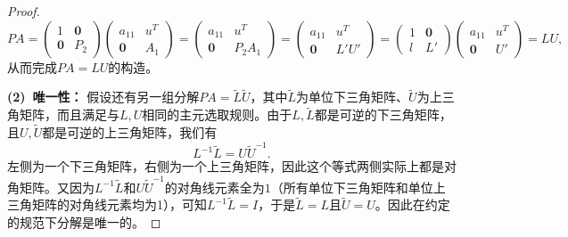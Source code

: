 \begin{proof}
	\[ P A = \begin{pmatrix} 1 & \mathbf{0} \\ \mathbf{0} & P_2 \end{pmatrix}
	\begin{pmatrix} a_{11} & u^T \\ \mathbf{0} & A_1 \end{pmatrix}
	= \begin{pmatrix} a_{11} & u^T \\ \mathbf{0} & P_2 A_1 \end{pmatrix}
	= \begin{pmatrix} a_{11} & u^T \\ \mathbf{0} & L' U' \end{pmatrix}
	= \begin{pmatrix} 1 & \mathbf{0} \\ l & L' \end{pmatrix}
	\begin{pmatrix} a_{11} & u^T \\ \mathbf{0} & U' \end{pmatrix} = L U, \] 
	从而完成$PA=LU$的构造。
	
	\textbf{(2)~唯一性：} 假设还有另一组分解$PA=\tilde{L}\tilde{U}$，其中$\tilde{L}$为单位下三角矩阵、$\tilde{U}$为上三角矩阵，而且满足与$L,U$相同的主元选取规则。由于$L,\tilde{L}$都是可逆的下三角矩阵，且$U,\tilde{U}$都是可逆的上三角矩阵，我们有
	\[ L^{-1}\tilde{L} = U \tilde{U}^{-1}. \] 
	左侧为一个下三角矩阵，右侧为一个上三角矩阵，因此这个等式两侧实际上都是对角矩阵。又因为$L^{-1}\tilde{L}$和$U\tilde{U}^{-1}$的对角线元素全为$1$（所有单位下三角矩阵和单位上三角矩阵的对角线元素均为1），可知$L^{-1}\tilde{L}=I$，于是$\tilde{L}=L$且$\tilde{U}=U$。因此在约定的规范下分解是唯一的。
\end{proof}


